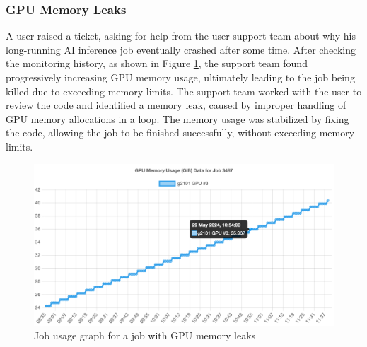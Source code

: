 \subsubsection{GPU Memory Leaks}
A user raised a ticket, asking for help from the user support team about why his long-running AI inference job eventually crashed after some time. After checking the monitoring history, as shown in Figure \ref{fig_job_memory_leak}, the support team found progressively increasing GPU memory usage, ultimately leading to the job being killed due to exceeding memory limits. The support team worked with the user to review the code and identified a memory leak, caused by improper handling of GPU memory allocations in a loop. The memory usage was stabilized by fixing the code, allowing the job to be finished successfully, without exceeding memory limits.

\begin{figure}[H]
    \centering
    \includegraphics[width=1\textwidth]{figures/job-memory-leak.png}
    \caption{Job usage graph for a job with GPU memory leaks}
    \label{fig_job_memory_leak}
\end{figure}
